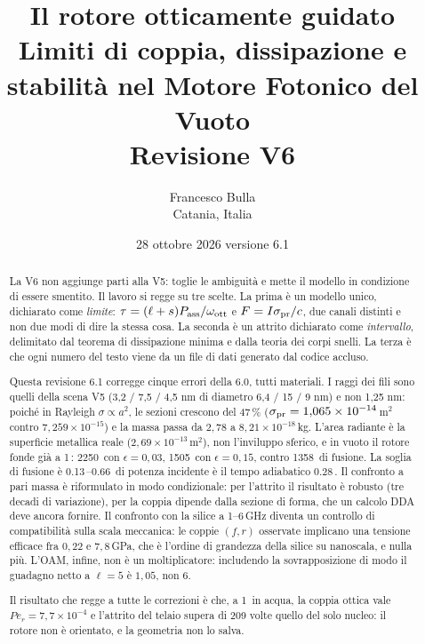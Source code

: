 \documentclass[11pt,a4paper]{article}
\title{\bfseries Il rotore otticamente guidato\\[0.3em]
\large Limiti di coppia, dissipazione e stabilit\`a nel Motore Fotonico del Vuoto\\
\large Revisione V6}
\author{Francesco Bulla\\ \small Catania, Italia}
\date{28 ottobre 2026 \quad \small versione 6.1}
\providecommand{\micro}{\textmu}
\providecommand{\SI}[2]{#1\,\text{#2}}
\begin{document}
\maketitle

\begin{abstract}
\noindent
La V6 non aggiunge parti alla V5: toglie le ambiguit\`a e mette il modello in
condizione di essere smentito. Il lavoro si regge su tre scelte. La prima \`e un
modello unico, dichiarato come \emph{limite}: $\tau=(\ell+s)P_{\rm ass}/\omega_{\rm
ott}$ e $F=I\sigma_{\rm pr}/c$, due canali distinti e non due modi di dire la stessa
cosa. La seconda \`e un attrito dichiarato come \emph{intervallo}, delimitato dal
teorema di dissipazione minima e dalla teoria dei corpi snelli. La terza \`e che ogni
numero del testo viene da un file di dati generato dal codice accluso.

Questa revisione 6.1 corregge cinque errori della 6.0, tutti materiali. I raggi dei
fili sono quelli della scena V5 (3,2 / 7,5 / 4,5 nm di diametro 6,4 / 15 / 9 nm) e
non 1,25 nm: poich\'e in Rayleigh $\sigma\propto a^2$, le sezioni crescono del 47\,\%
($\sigma_{\rm pr}=1{,}065\times10^{-14}$\,m$^2$ contro $7{,}259\times10^{-15}$) e la
massa passa da $2{,}78$ a $8{,}21\times10^{-18}$\,kg. L'area radiante \`e la
superficie metallica reale ($2{,}69\times10^{-13}$\,m$^2$), non l'inviluppo sferico,
e in vuoto il rotore fonde gi\`a a \SI{1}{\micro W}: \SI{2250}{K} con
$\epsilon=0{,}03$, \SI{1505}{K} con $\epsilon=0{,}15$, contro \SI{1358}{K} di fusione.
La soglia di fusione \`e \SI{0.13}{}--\SI{0.66}{\micro W} di potenza incidente \`e il
tempo adiabatico \SI{0.28}{ms}. Il confronto a pari massa \`e riformulato in modo
condizionale: per l'attrito il risultato \`e robusto (tre decadi di variazione), per
la coppia dipende dalla sezione di forma, che un calcolo DDA deve ancora fornire. Il
confronto con la silice a 1--6\,GHz diventa un controllo di compatibilit\`a sulla
scala meccanica: le coppie $(f,r)$ osservate implicano una tensione efficace fra
$0{,}22$ e $7{,}8$\,GPa, che \`e l'ordine di grandezza della silice su nanoscala, e
nulla pi\`u. L'OAM, infine, non \`e un moltiplicatore: includendo la sovrapposizione di
modo il guadagno netto a $\ell=5$ \`e $1{,}05$, non $6$.

Il risultato che regge a tutte le correzioni \`e che, a \SI{1}{\micro W} in acqua, la
coppia ottica vale $Pe_r=7{,}7\times10^{-4}$ e l'attrito del telaio supera di 209
volte quello del solo nucleo: il rotore non \`e orientato, e la geometria non lo
salva.
\end{abstract}
\end{document}
